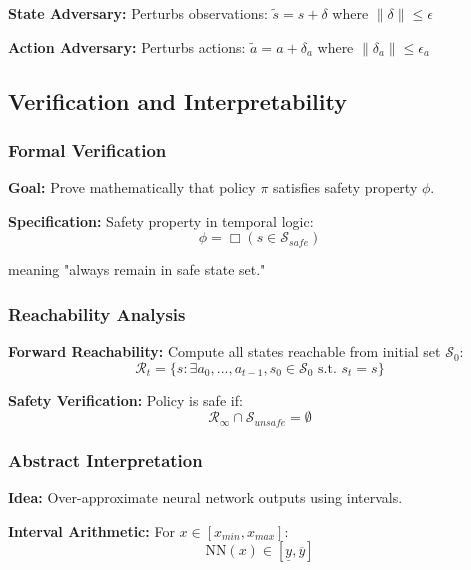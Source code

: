 \documentclass[12pt]{article}
\begin{document}
{{{{\textbf{State Adversary:} Perturbs observations: $\tilde{s} = s + \delta$ where $\|\delta\| \leq \epsilon$

\textbf{Action Adversary:} Perturbs actions: $\tilde{a} = a + \delta_a$ where $\|\delta_a\| \leq \epsilon_a$

\subsection{Verification and Interpretability}

\subsubsection{Formal Verification}

\textbf{Goal:} Prove mathematically that policy $\pi$ satisfies safety property $\phi$.

\textbf{Specification:} Safety property in temporal logic:
\begin{equation}
\phi = \Box(s \in \mathcal{S}_{safe})
\end{equation}

meaning "always remain in safe state set."

\subsubsection{Reachability Analysis}

\textbf{Forward Reachability:} Compute all states reachable from initial set $\mathcal{S}_0$:
\begin{equation}
\mathcal{R}_t = \{s : \exists a_0, ..., a_{t-1}, s_0 \in \mathcal{S}_0 \text{ s.t. } s_t = s\}
\end{equation}

\textbf{Safety Verification:} Policy is safe if:
\begin{equation}
\mathcal{R}_\infty \cap \mathcal{S}_{unsafe} = \emptyset
\end{equation}

\subsubsection{Abstract Interpretation}

\textbf{Idea:} Over-approximate neural network outputs using intervals.

\textbf{Interval Arithmetic:} For $x \in [x_{min}, x_{max}]$:
\begin{equation}
\text{NN}(x) \in [\underline{y}, \overline{y}]
\end{equation}

}}}}
\end{document}

